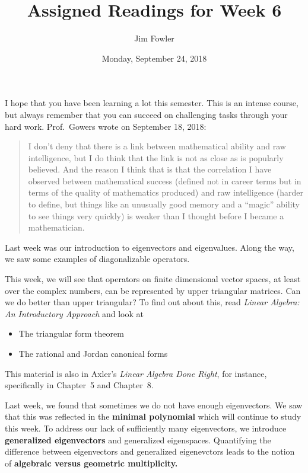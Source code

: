\documentclass{homework}
\author{Jim Fowler}
\title{Assigned Readings for Week 6}
\date{Monday, September 24, 2018}
\begin{document}
\maketitle

I hope that you have been learning a lot this semester.  This is an intense course, but always remember that you can
succeed on challenging tasks through your hard work.  Prof.~Gowers
wrote on September 18, 2018:
\begin{quote}
  I don't deny that there is a link between mathematical ability and
  raw intelligence, but I do think that the link is not as close as is
  popularly believed. And the reason I think that is that the
  correlation I have observed between mathematical success (defined
  not in career terms but in terms of the quality of mathematics
  produced) and raw intelligence (harder to define, but things like an
  unusually good memory and a ``magic'' ability to see things very
  quickly) is weaker than I thought before I became a mathematician.
\end{quote}
Last week was our introduction to
eigenvectors and eigenvalues.  Along the way, we saw some examples of
diagonalizable operators.

This week, we will see that operators on finite dimensional vector
spaces, at least over the complex numbers, can be represented by upper
triangular matrices.  Can we do better than upper triangular?
To find out about this, read \textit{Linear Algebra: An Introductory Approach} and
look at
\begin{itemize}
\item {} The triangular form theorem
\item {} The rational and Jordan canonical forms
\end{itemize}
This material is also in Axler's \textit{Linear Algebra Done Right},
for instance, specifically in Chapter~5 and Chapter~8.

Last week, we found that sometimes we do not have enough eigenvectors.
We saw that this was reflected in the \textbf{minimal polynomial}
which will continue to study this week.  To address our lack of
sufficiently many eigenvectors, we introduce \textbf{generalized
  eigenvectors} and generalized eigenspaces.  Quantifying the
difference between eigenvectors and generalized eigenevctors leads to
the notion of \textbf{algebraic versus geometric multiplicity.}
\end{document}
